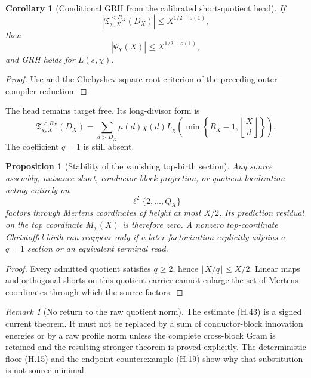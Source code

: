 \documentclass[11pt]{article}
\newtheorem{proposition}[theorem]{Proposition}
\newtheorem{corollary}[theorem]{Corollary}
\theoremstyle{definition}
\theoremstyle{remark}
\newtheorem{remark}[theorem]{Remark}
\begin{document}
\begin{corollary}[Conditional GRH from the calibrated short-quotient head]
\label{cor:hyperbola-head-GRH}
If
\[
 \boxed{
 |\mathfrak T_{\chi,X}^{<R_X}(D_X)|
 \le X^{1/2+o(1)},}
 \tag{H.43}
\]
then
\[
 |\Psi_\chi(X)|\le X^{1/2+o(1)},
 \tag{H.44}
\]
and GRH holds for \(L(s,\chi)\).
\end{corollary}

\begin{proof}
Use  and the Chebyshev square-root criterion of
the preceding outer-compiler reduction.
\end{proof}

The head remains target free.  Its long-divisor form is
\[
 \boxed{
 \mathfrak T_{\chi,X}^{<R_X}(D_X)
 =\sum_{d>D_X}\mu(d)\chi(d)
   L_\chi\!\left(
    \min\left\{R_X-1,
      \left\lfloor\frac Xd\right\rfloor
    \right\}
   \right).}
 \tag{H.45}
\]
The coefficient \(q=1\) is still absent.

\begin{proposition}[Stability of the vanishing top-birth section]
\label{prop:hyperbola-top-birth-stability}
Any source assembly, nuisance short, conductor-block projection, or quotient
localization acting entirely on
\[
 \ell^2\{2,\ldots,Q_X\}
 \tag{H.46}
\]
factors through Mertens coordinates of height at most \(X/2\).  Its prediction residual on the top coordinate \(M_\chi(X)\) is therefore zero.
A nonzero top-coordinate Christoffel birth can reappear only if a later
factorization explicitly adjoins a \(q=1\) section or an equivalent terminal
read.
\end{proposition}

\begin{proof}
Every admitted quotient satisfies \(q\ge2\), hence
\(\lfloor X/q\rfloor\le X/2\).  Linear maps and orthogonal shorts on this
quotient carrier cannot enlarge the set of Mertens coordinates through which
the source factors.
\end{proof}

\begin{remark}[No return to the raw quotient norm]
The estimate \textup{(H.43)} is a signed current theorem.  It must not be
replaced by a sum of conductor-block innovation energies or by a raw profile
norm unless the complete cross-block Gram is retained and the resulting
stronger theorem is proved explicitly.  The deterministic floor
\textup{(H.15)} and the endpoint counterexample
\textup{(H.19)} show why that substitution is not source minimal.
\end{remark}
\end{document}
